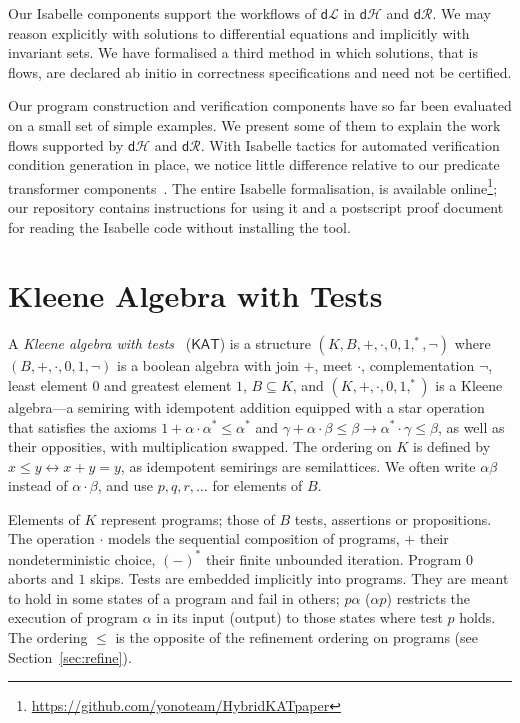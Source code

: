 \documentclass[envcountsame,envcountsect]{llncs}
\newcommand{\KAT}{\mathsf{KAT}}
\newcommand{\dL}{\mathsf{d}\mathcal{L}}
\newcommand{\dH}{\mathsf{d}\mathcal{H}}
\newcommand{\dR}{\mathsf{d}\mathcal{R}}
\begin{document}
Our Isabelle components support the  workflows of $\dL$ in $\dH$
and $\dR$. We may reason explicitly with solutions to differential
equations and implicitly with invariant sets. We have formalised a third
method in which solutions, that is flows, are declared ab initio in
correctness specifications and need not be certified.

Our program construction and verification components have so far been
evaluated on a small set of simple examples. We present some of them
to explain the work flows supported by $\dH$ and $\dR$. With Isabelle
tactics for automated verification condition generation in place, we
notice little difference relative to our predicate transformer
components~\cite{MuniveS19}.  The entire Isabelle formalisation, is
available
online\footnote{\url{https://github.com/yonoteam/HybridKATpaper}}; our
repository contains instructions for using it and a postscript proof
document for reading the Isabelle code without installing the tool.



\section{Kleene Algebra with Tests}\label{sec:kat} 

A \emph{Kleene algebra with tests}~\cite{Kozen97} ($\KAT$) is a
structure $(K,B,+,\cdot,0,1,^\ast,\neg)$ where $(B,+,\cdot,0,1,\neg)$
is a boolean algebra with join $+$, meet $\cdot$, complementation
$\neg$, least element $0$ and greatest element $1$, $B\subseteq K$,
and $(K,+,\cdot,0,1,^\ast)$ is a Kleene algebra---a semiring with
idempotent addition equipped with a star operation that satisfies the
axioms $1+\alpha\cdot\alpha^\ast \le \alpha^\ast$ and
$\gamma+\alpha\cdot \beta\le \beta\rightarrow \alpha^\ast \cdot
\gamma\le \beta$,
as well as their opposities, with multiplication swapped.  The
ordering on $K$ is defined by $x\le y\leftrightarrow x+y=y$, as
idempotent semirings are semilattices. We often write $\alpha\beta$
instead of $\alpha\cdot\beta$, and use $p,q,r,\dots$ for elements of $B$.

Elements of $K$ represent programs; those of $B$ tests, assertions or
propositions.  The operation $\cdot$ models the sequential composition
of programs, $+$ their nondeterministic choice, $(-)^\ast$ their
finite unbounded iteration. Program $0$ aborts and $1$ skips.  Tests
are embedded implicitly into programs. They are meant to hold in some
states of a program and fail in others; $p\alpha$ ($\alpha p$)
restricts the execution of program $\alpha$ in its input (output) to
those states where test $p$ holds. The ordering $\le$ is the opposite
of the refinement ordering on programs (see Section~\ref{sec:refine}).
\end{document}
